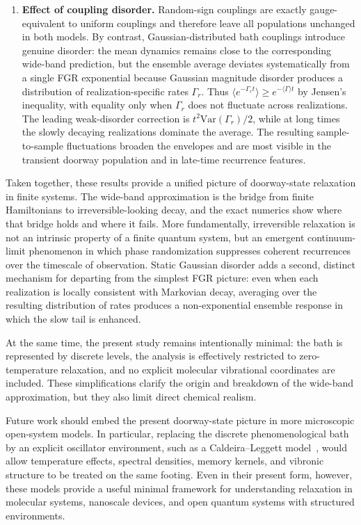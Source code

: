\documentclass[aps,prx,reprint,showpacs,showkeys,floatfix]{revtex4-2}
\begin{document}
\begin{enumerate}
\item \textbf{Effect of coupling disorder.}
Random-sign couplings are exactly gauge-equivalent to uniform couplings and
therefore leave all populations unchanged in both models.  By contrast,
Gaussian-distributed bath couplings introduce genuine disorder: the mean
dynamics remains close to the corresponding wide-band prediction, but the
ensemble average deviates systematically from a single FGR exponential
because Gaussian magnitude disorder produces a distribution of
realization-specific rates $\Gamma_r$.  Thus
$\langle e^{-\Gamma_r t}\rangle \ge e^{-\langle\Gamma\rangle t}$ by
Jensen's inequality, with equality only when $\Gamma_r$ does not fluctuate
across realizations.  The leading weak-disorder correction is
$t^2\mathrm{Var}(\Gamma_r)/2$, while at long times the slowly decaying
realizations dominate the average.  The resulting sample-to-sample
fluctuations broaden the envelopes and are most visible in the transient
doorway population and in late-time recurrence features.
\end{enumerate}

Taken together, these results provide a unified picture of doorway-state
relaxation in finite systems.  The wide-band approximation is the bridge
from finite Hamiltonians to irreversible-looking decay, and the exact
numerics show where that bridge holds and where it fails.  More
fundamentally, irreversible relaxation is not an intrinsic property of a
finite quantum system, but an emergent continuum-limit phenomenon in which
phase randomization suppresses coherent recurrences over the timescale of
observation.  Static Gaussian disorder adds a second, distinct mechanism for
departing from the simplest FGR picture: even when each realization is
locally consistent with Markovian decay, averaging over the resulting
distribution of rates produces a non-exponential ensemble response in which
the slow tail is enhanced.

At the same time, the present study remains intentionally minimal: the bath
is represented by discrete levels, the analysis is effectively restricted to
zero-temperature relaxation, and no explicit molecular vibrational
coordinates are included.  These simplifications clarify the origin and
breakdown of the wide-band approximation, but they also limit direct
chemical realism.

Future work should embed the present doorway-state picture in more
microscopic open-system models.  In particular, replacing the discrete
phenomenological bath by an explicit oscillator environment, such as a
Caldeira--Leggett model~\cite{Caldeira_Leggett_1983,Leggett_1984,Weiss},
would allow temperature effects, spectral densities, memory kernels, and
vibronic structure to be treated on the same footing.  Even in their present
form, however, these models provide a useful minimal framework for
understanding relaxation in molecular systems, nanoscale devices, and open
quantum systems with structured environments.
\end{document}
